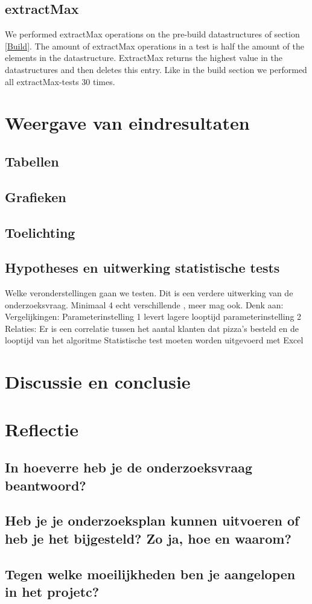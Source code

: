 \documentclass{article}
\begin{document}
\subsection{extractMax}
We performed extractMax operations on the pre-build datastructures of section \ref{Build}. The amount of extractMax operations in a test is half the amount of the elements in the datastructure. ExtractMax returns the highest value in the datastructures and then deletes this entry. Like in the build section we performed all extractMax-tests 30 times.
\section{Weergave van eindresultaten}
\subsection{Tabellen}
\subsection{Grafieken}
\subsection{Toelichting}
\subsection{Hypotheses en uitwerking statistische tests}
 Welke veronderstellingen gaan we testen. Dit is een verdere uitwerking van de onderzoeksvraag. Minimaal 4 echt verschillende , meer mag ook. Denk aan:
Vergelijkingen: Parameterinstelling 1 levert lagere looptijd parameterinstelling 2 Relaties: Er is een correlatie tussen het aantal klanten dat pizza's besteld en de looptijd van het algoritme
Statistische test moeten worden uitgevoerd met Excel
\section{Discussie en conclusie}
\section{Reflectie}
\subsection{In hoeverre heb je de onderzoeksvraag beantwoord?}
\subsection{Heb je je onderzoeksplan kunnen uitvoeren of heb je het bijgesteld? Zo ja, hoe en waarom?}
\subsection{Tegen welke moeilijkheden ben je aangelopen in het projetc?}
\end{document}
